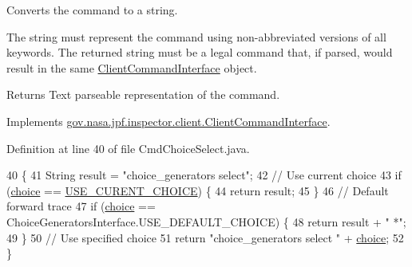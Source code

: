 Converts the command to a string. 

The string must represent the command using non-\/abbreviated versions of all keywords. The returned string must be a legal command that, if parsed, would result in the same \hyperlink{interfacegov_1_1nasa_1_1jpf_1_1inspector_1_1client_1_1_client_command_interface}{Client\+Command\+Interface} object.

\begin{DoxyReturn}{Returns}
Text parseable representation of the command. 
\end{DoxyReturn}


Implements \hyperlink{interfacegov_1_1nasa_1_1jpf_1_1inspector_1_1client_1_1_client_command_interface_a393044f5be05c3ab3451b72aeff7af62}{gov.\+nasa.\+jpf.\+inspector.\+client.\+Client\+Command\+Interface}.



Definition at line 40 of file Cmd\+Choice\+Select.\+java.


\begin{DoxyCode}
40                                         \{
41     String result = \textcolor{stringliteral}{"choice\_generators select"};
42     \textcolor{comment}{// Use current choice}
43     \textcolor{keywordflow}{if} (\hyperlink{classgov_1_1nasa_1_1jpf_1_1inspector_1_1client_1_1commands_1_1_cmd_choice_select_ae6fd217c673bc63e67a1b7c54ea78376}{choice} == \hyperlink{classgov_1_1nasa_1_1jpf_1_1inspector_1_1client_1_1commands_1_1_cmd_choice_select_a0b120ead5754a831aeb7021179e9ab9f}{USE\_CURENT\_CHOICE}) \{
44       \textcolor{keywordflow}{return} result;
45     \}
46     \textcolor{comment}{// Default forward trace}
47     \textcolor{keywordflow}{if} (\hyperlink{classgov_1_1nasa_1_1jpf_1_1inspector_1_1client_1_1commands_1_1_cmd_choice_select_ae6fd217c673bc63e67a1b7c54ea78376}{choice} == ChoiceGeneratorsInterface.USE\_DEFAULT\_CHOICE) \{
48       \textcolor{keywordflow}{return} result + \textcolor{stringliteral}{" *"};
49     \}
50     \textcolor{comment}{// Use specified choice}
51     \textcolor{keywordflow}{return} \textcolor{stringliteral}{"choice\_generators select "} + \hyperlink{classgov_1_1nasa_1_1jpf_1_1inspector_1_1client_1_1commands_1_1_cmd_choice_select_ae6fd217c673bc63e67a1b7c54ea78376}{choice};
52   \}
\end{DoxyCode}

